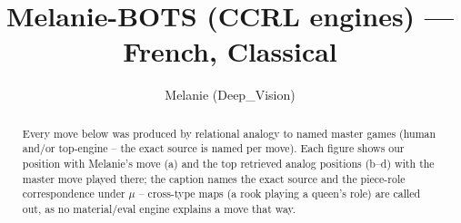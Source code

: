 \documentclass[11pt]{article}
\title{Melanie-BOTS (CCRL engines) — French, Classical}
\author{Melanie (Deep\_Vision)}
\date{}
\begin{document}
\maketitle

\begin{abstract}Every move below was produced by relational analogy to named master games (human and/or top-engine -- the exact source is named per move). Each figure shows our position with Melanie's move (a) and the top retrieved analog positions (b--d) with the master move played there; the caption names the exact source and the piece-role correspondence under $\mu$ -- cross-type maps (a rook playing a queen's role) are called out, as no material/eval engine explains a move that way.\end{abstract}

\begin{figure}[p]\centering
\begin{subfigure}{0.46\textwidth}\centering
\resizebox{\linewidth}{!}{%
\newchessgame
\chessboard[
  setfen={rnb1k2r/pppnqppp/4p3/3pP3/3P4/2N5/PPP2PPP/R2QKBNR w KQkq - 0 7},
  showmover=false,
  pgfstyle=straightmove, color=movearrow, markmove={f2-f4}
]}
\caption{}
\end{subfigure}\hfill
\begin{subfigure}{0.46\textwidth}\centering
\resizebox{\linewidth}{!}{%
\newchessgame
\chessboard[
  setfen={rnb1k2r/pppnqppp/4p3/3pP3/3P4/2N5/PPP2PPP/R2QKBNR w KQkq - 0 7},
  showmover=false,
  pgfstyle=straightmove, color=movearrow, markmove={f2-f4}
]}
\caption{}
\end{subfigure}
\\[4pt]
\begin{subfigure}{0.46\textwidth}\centering
\resizebox{\linewidth}{!}{%
\newchessgame
\chessboard[
  setfen={rnb1k2r/pppnqppp/4p3/3pP3/3P4/2N5/PPP2PPP/R2QKBNR w KQkq - 0 7},
  showmover=false,
  pgfstyle=straightmove, color=movearrow, markmove={f2-f4}
]}
\caption{}
\end{subfigure}\hfill
\begin{subfigure}{0.46\textwidth}\centering
\resizebox{\linewidth}{!}{%
\newchessgame
\chessboard[
  setfen={rnb1k2r/pppnqppp/4p3/3pP3/3P4/2N5/PPP2PPP/R2QKBNR w KQkq - 0 7},
  showmover=false,
  pgfstyle=straightmove, color=movearrow, markmove={f2-f4}
]}
\caption{}
\end{subfigure}

\end{figure}
\end{document}
